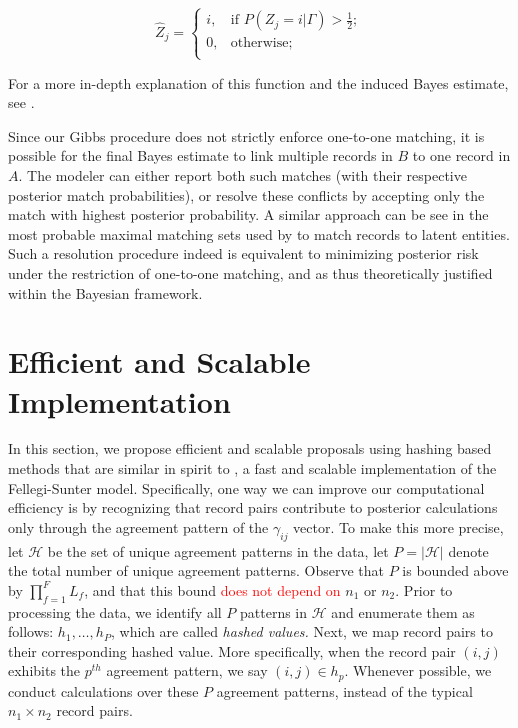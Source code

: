 \documentclass[12pt,letterpaper]{article}
\newcommand{\1}[1]{\mathbb{I}\!\left[#1\right]} %
\begin{document}
\[\hat{Z}_j =\begin{cases} 
	i,  & \text{if } P(Z_j = i |\Gamma) > \frac{1}{2}; \\
	0,  & \text{otherwise} ; \\
\end{cases}\]

For a more in-depth explanation of this function and the induced Bayes
estimate, see \citep{sadinle_bayesian_2017}.

Since our Gibbs procedure does not strictly enforce one-to-one matching,
it is possible for the final Bayes estimate to link multiple records in
\(B\) to one record in \(A\). The modeler can either report both such
matches (with their respective posterior match probabilities), or
resolve these conflicts by accepting only the match with highest
posterior probability. A similar approach can be see in the most probable maximal matching sets used by \citep{steorts_2013} to match records to latent entities. Such a resolution procedure indeed is equivalent
to minimizing posterior risk under the restriction of one-to-one
matching, and as thus theoretically justified within the Bayesian
framework.

\section{Efficient and Scalable Implementation}
\label{sec:efficiency}
In this section, we propose efficient and scalable proposals using hashing based methods that are similar in spirit to \citep{enamorado2019}, a fast and scalable implementation of the Fellegi-Sunter model. 
 Specifically, one way we can improve our computational efficiency is by recognizing that record pairs contribute to posterior calculations only
through the agreement pattern of the \(\gamma_{ij}\) vector. To make this more precise, let 
\(\mathcal{H}\) be the set of unique agreement patterns in the data, let
\(P = |\mathcal{H}|\) denote the total number of unique agreement
patterns.  Observe that \(P\) is bounded above by \(\prod_{f=1}^F L_f\), and
that this bound \textcolor{red}{does not depend on} \(n_1\) or \(n_2\). Prior to
processing the data, we identify all \(P\) patterns in \(\mathcal{H}\)
and enumerate them as follows: \(h_1, \ldots, h_P\), which are called \emph{hashed values.}
Next, we map record pairs to their corresponding hashed value. 
More specifically, when the record pair \((i,j)\) 
exhibits the \(p^{th}\) agreement pattern, we say \((i,j) \in h_p\).
Whenever possible, we conduct calculations over these \(P\) agreement
patterns, instead of the typical  \(n_1 \times n_2\) record pairs. 
\end{document}
